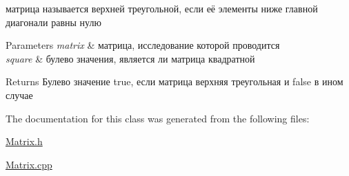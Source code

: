 матрица называется верхней треугольной, если её элементы ниже главной диагонали равны нулю 
\begin{DoxyParams}{Parameters}
{\em matrix} & матрица, исследование которой проводится \\
\hline
{\em square} & булево значения, является ли матрица квадратной \\
\hline
\end{DoxyParams}
\begin{DoxyReturn}{Returns}
Булево значение true, если матрица верхняя треугольная и false в ином случае
\end{DoxyReturn}


The documentation for this class was generated from the following files\-:\begin{DoxyCompactItemize}
\item 
\hyperlink{_matrix_8h}{Matrix.\-h}\item 
\hyperlink{_matrix_8cpp}{Matrix.\-cpp}\end{DoxyCompactItemize}
